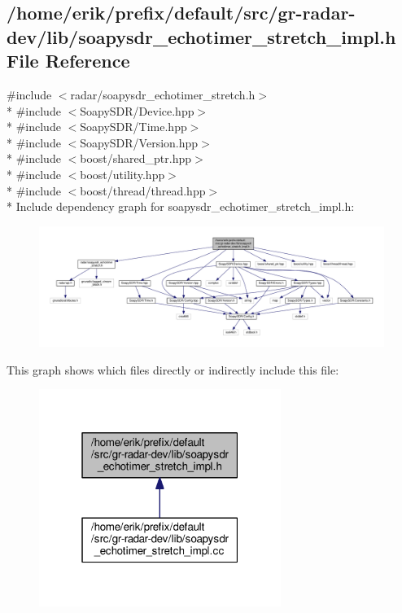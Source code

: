 \subsection{/home/erik/prefix/default/src/gr-\/radar-\/dev/lib/soapysdr\+\_\+echotimer\+\_\+stretch\+\_\+impl.h File Reference}
\label{soapysdr__echotimer__stretch__impl_8h}
{\ttfamily \#include $<$radar/soapysdr\+\_\+echotimer\+\_\+stretch.\+h$>$}\\*
{\ttfamily \#include $<$Soapy\+S\+D\+R/\+Device.\+hpp$>$}\\*
{\ttfamily \#include $<$Soapy\+S\+D\+R/\+Time.\+hpp$>$}\\*
{\ttfamily \#include $<$Soapy\+S\+D\+R/\+Version.\+hpp$>$}\\*
{\ttfamily \#include $<$boost/shared\+\_\+ptr.\+hpp$>$}\\*
{\ttfamily \#include $<$boost/utility.\+hpp$>$}\\*
{\ttfamily \#include $<$boost/thread/thread.\+hpp$>$}\\*
Include dependency graph for soapysdr\+\_\+echotimer\+\_\+stretch\+\_\+impl.\+h\+:
\nopagebreak
\begin{figure}[H]
\begin{center}
\leavevmode
\includegraphics[width=350pt]{d7/d72/soapysdr__echotimer__stretch__impl_8h__incl}
\end{center}
\end{figure}
This graph shows which files directly or indirectly include this file\+:
\nopagebreak
\begin{figure}[H]
\begin{center}
\leavevmode
\includegraphics[width=223pt]{d4/d24/soapysdr__echotimer__stretch__impl_8h__dep__incl}
\end{center}
\end{figure}
